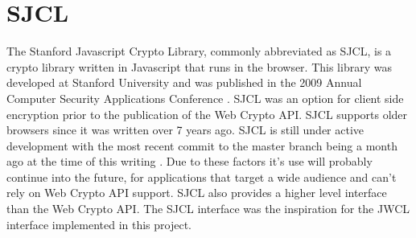 \section{SJCL}


The Stanford Javascript Crypto Library, commonly abbreviated as SJCL, is a crypto library written in Javascript that runs in the browser. This library was developed at Stanford University and was published in the 2009 Annual Computer Security Applications Conference \cite{sjcl-paper}. SJCL was an option for client side encryption prior to the publication of the Web Crypto API. SJCL supports older browsers since it was written over 7 years ago. SJCL is still under active development with the most recent commit to the master branch being a month ago at the time of this writing \cite{sjcl-library}. Due to these factors it's use will probably continue into the future, for applications that target a wide audience and can't rely on Web Crypto API support. SJCL also provides a higher level interface than the Web Crypto API. The SJCL interface was the inspiration for the JWCL interface implemented in this project.

